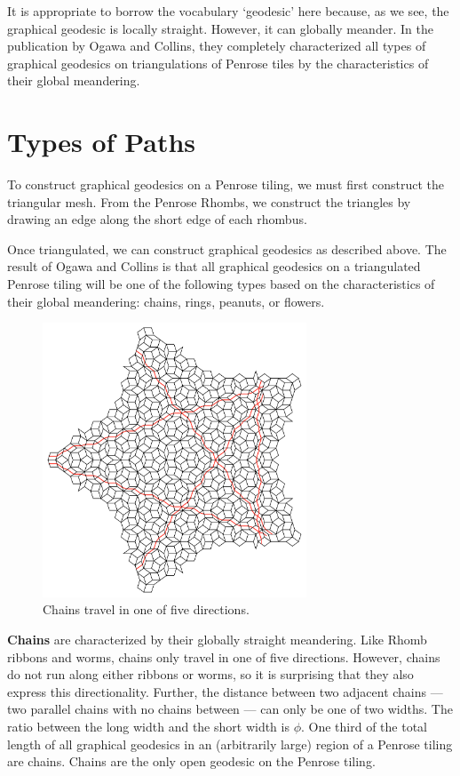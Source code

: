 \documentclass[
  oneside,
  11pt, a4paper,
  footinclude=true,
  headinclude=true,
  cleardoublepage=empty
]{scrbook}
\begin{document}
It is appropriate to borrow the vocabulary `geodesic' here because, as we see, the graphical geodesic is locally straight. However, it can globally meander. In the publication by Ogawa and Collins, they completely characterized all types of graphical geodesics on triangulations of Penrose tiles by the characteristics of their global meandering.

\section{Types of Paths}
To construct graphical geodesics on a Penrose tiling, we must first construct the triangular mesh. From the Penrose Rhombs, we construct the triangles by drawing an edge along the short edge of each rhombus. 

Once triangulated, we can construct graphical geodesics as described above. The result of Ogawa and Collins is that all graphical geodesics on a triangulated Penrose tiling will be one of the following types based on the characteristics of their global meandering: chains, rings, peanuts, or flowers.

\begin{figure}[H]
\centering
\includegraphics[width=0.7\textwidth]{Chains}
\caption[Chains]{Chains travel in one of five directions.}
\end{figure}
\textbf{Chains} are characterized by their globally straight meandering. Like Rhomb ribbons and worms, chains only travel in one of five directions. However, chains do not run along either ribbons or worms, so it is surprising that they also express this directionality. Further, the distance between two adjacent chains --- two parallel chains with no chains between --- can only be one of two widths. The ratio between the long width and the short width is $\phi$. One third of the total length of all graphical geodesics in an (arbitrarily large) region of a Penrose tiling are chains. Chains are the only open geodesic on the Penrose tiling.
\end{document}
